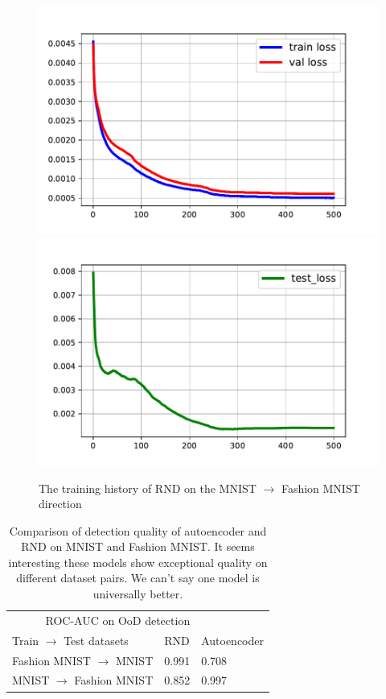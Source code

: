 \documentclass{article}
\begin{document}
\begin{figure}[h]
    \begin{center}
        \includegraphics[scale=0.45]{learning_curves_train_original_to_fashion.pdf}
        \includegraphics[scale=0.45]{learning_curves_test_original_to_fashion.pdf}
    \end{center}
    \caption{The training history of RND on the MNIST $\rightarrow$ Fashion MNIST direction}
    \label{fig:learning_on_original}
\end{figure}

\begin{table}[h]
  \caption{Comparison of detection quality of autoencoder and RND on MNIST and Fashion MNIST. It seems interesting these models show exceptional quality on different dataset pairs. We can't say one model is universally better.}
  \label{table}
  \centering
  \begin{tabular}{lll}
    \toprule
    \multicolumn{2}{r}{ROC-AUC on OoD detection}                   \\
    \cmidrule(r){2-3}
    Train $\rightarrow$ Test datasets     & RND     & Autoencoder \\
    \midrule
    Fashion MNIST $\rightarrow$ MNIST & 0.991 & 0.708      \\
    MNIST $\rightarrow$ Fashion MNIST & 0.852 & 0.997      \\
    \bottomrule
  \end{tabular}
\end{table}
\end{document}
